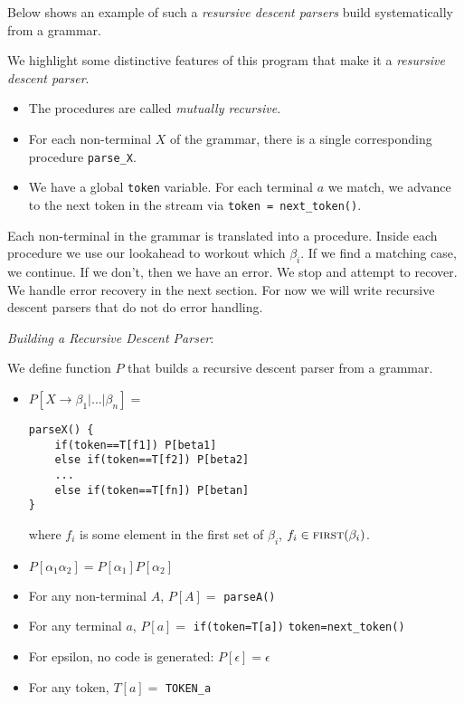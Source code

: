 Below shows an example of such a \textit{resursive descent parsers} 
build systematically from a grammar. 

We highlight some distinctive features of this program that make it 
a \textit{resursive descent parser}.
\begin{itemize}
\item The procedures are called \textit{mutually recursive}. 
\item For each non-terminal $X$ of the grammar, there is a single corresponding procedure \lstinline{parse_X}.
\item We have a global \lstinline{token} variable. For each terminal $a$ we match, we advance to the next 
token in the stream via \lstinline{token = next_token()}. 
\end{itemize}

Each non-terminal in the grammar is translated into a procedure. 
Inside each procedure we use our lookahead to workout which $\beta_i$. 
If  we find a matching case, we continue.
If we don't, then we have an error. We stop and attempt to recover. 
We handle error recovery in the next section. For now we will write 
recursive descent parsers that do not do error handling. 

\frmrule

\textit{Building a Recursive Descent Parser}:

We define function $P$ that builds a recursive descent parser from a grammar. 

\begin{itemize}
\item 
$P[X \rightarrow \beta_1 | ... | \beta_n]=$ 
\begin{lstlisting}
parseX() {
	if(token==T[f1]) P[beta1]
	else if(token==T[f2]) P[beta2]
	...
	else if(token==T[fn]) P[betan]
}
\end{lstlisting}
where $f_i$ is some element in the first set of $\beta_i$, $f_i\in \textsc{first}(\beta_i)$.
\item $P[\alpha_1 \alpha_2]= P[\alpha_1]P[\alpha_2]$
\item For any non-terminal $A$, $P[A]=$ \lstinline{parseA()}
\item For any terminal $a$, $P[a]=$ \lstinline{if(token=T[a])} \lstinline{token=next_token()}
\item For epsilon, no code is generated: $P[\epsilon]=\epsilon$ 
\item For any token, $T[a]=$ \lstinline{TOKEN_a}
\end{itemize}

